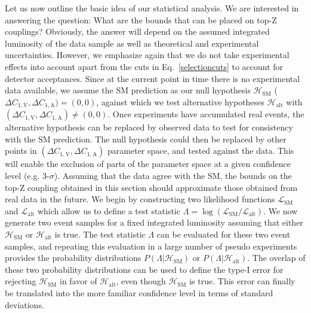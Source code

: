 \documentclass[preprint]{JHEP3} %
\newcommand{\SM}{\mathrm{SM}}
\newcommand{\alt}{\mathrm{alt}}
\def\DConeA{\Delta C_{1,\mathrm{A}}}
\def\DConeV{\Delta C_{1,\mathrm{V}}}
\def\Halt{\mathcal{H}_{\mathrm{alt}}}
\begin{document}
Let us now outline the basic idea of our statistical analysis.
We are interested in answering the question: What are the bounds that can be placed on top-Z couplings? 
Obviously, the answer will depend on the assumed integrated luminosity of the data sample as well as theoretical and experimental uncertainties. 
However, we emphasize again that we do not take experimental effects into account apart from the cuts in Eq.~\ref{selectioncuts} to account for detector acceptances.
Since at the current point in time there is no experimental data available, we assume the SM prediction as our null hypothesis 
$\mathcal{H}_{\mathrm{SM}}$ ($\DConeV,\DConeA)=(0,0)$,
against which we test alternative hypotheses $\Halt$ with $(\DConeV,\DConeA) \ne (0,0)$.
Once experiments have accumulated real events, the alternative hypothesis can be replaced by observed data to test for consistency with the SM prediction. 
The null hypothesis could then be replaced by  other points in $(\DConeV,\DConeA)$ parameter space, and tested against the data. 
This will enable the exclusion of parts of the parameter space at a given confidence level (e.g. 3-$\sigma$). 
Assuming that the data agree with the SM, 
the bounds on the top-Z coupling 
obtained in this section should approximate those obtained from real data in the future. 
We begin by constructing two likelihood functions $\mathcal{L}_{\SM}$ and $\mathcal{L}_{\alt}$ which allow us to define a test 
statistic $\Lambda = \log \left( \mathcal{L}_{\SM} / \mathcal{L}_{\alt} \right)$.
We now generate two event samples for a fixed integrated luminosity assuming that either $\mathcal{H}_{\mathrm{SM}}$ or $\Halt$ is true.
The test statistic $\Lambda$ can be evaluated for these two event samples, and 
repeating this evaluation in a large number of pseudo experiments provides the probability distributions $P(\Lambda|\mathcal{H}_{\mathrm{SM}})$ or $P(\Lambda|\Halt)$.
The overlap of these two probability distributions can be used to define the type-I error for rejecting $\mathcal{H}_{\mathrm{SM}}$ in favor of $\Halt$, even though $\mathcal{H}_{\mathrm{SM}}$ is true.
This error can finally be translated into the more familiar confidence level in terms of standard deviations.
\end{document}
